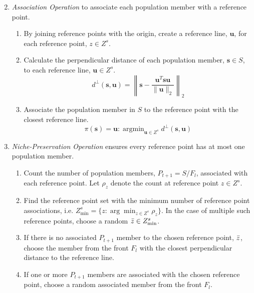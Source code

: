 \documentclass[mscthesis, 11pt]{usiinfthesis}
\DeclareMathOperator*{\argmin}{argmin}
\theoremstyle{newdefinition}
\begin{document}
\begin{algorithm}[ht]
\begin{enumerate}
\begin{enumerate}
\begin{equation}
            \end{equation}
        \end{enumerate}
        \item \emph{Association Operation} to associate each population member with a reference point. 
        \begin{enumerate}
            \item By joining reference points with the origin, create a reference line, $\mathbf{u}$, for each reference point, $z \in Z^s$.
            \item Calculate the perpendicular distance of each population member, $\mathbf{s} \in S$, to each reference line, $\mathbf{u} \in Z^s$. 
            \begin{equation}
                d^{\perp}(\mathbf{s}, \mathbf{u}) = \left\lVert \mathbf{s} - \frac{\mathbf{u}^T \mathbf{su}}{\|\mathbf{u}\|_2} \right\rVert_2
            \end{equation}
            \item Associate the population member in $S$ to the reference point with the closest reference line. 
            \begin{equation}
                \pi(\mathbf{s}) = \mathbf{u} : \argmin_{\mathbf{u} \in Z^s} d^{\perp}(\mathbf{s}, \mathbf{u})
            \end{equation}
        \end{enumerate}
        \item \emph{Niche-Preservation Operation} ensures every reference point has at most one population member.
        \begin{enumerate}
            \item Count the number of population members, $P_{t+1} = S / F_l$, associated with each reference point. Let $\rho_z$ denote the count at reference point $z \in Z^s$.
            \item Find the reference point set with the minimum number of reference point associations, i.e. $Z^{s}_{\min} = \{z : \arg \min_{z \in Z^s} \rho_z\}$. In the case of multiple such reference points, choose a random $\Bar{z} \in Z^{s}_{\min}$.
            \item If there is no associated $P_{t+1}$ member to the chosen reference point, $\Bar{z}$, choose the member from the front $F_l$ with the closest perpendicular distance to the reference line.
            \item If one or more $P_{t+1}$ members are associated with the chosen reference point, choose a random associated member from the front $F_l$.
        \end{enumerate}
    \end{enumerate}
\end{algorithm}
\end{document}
